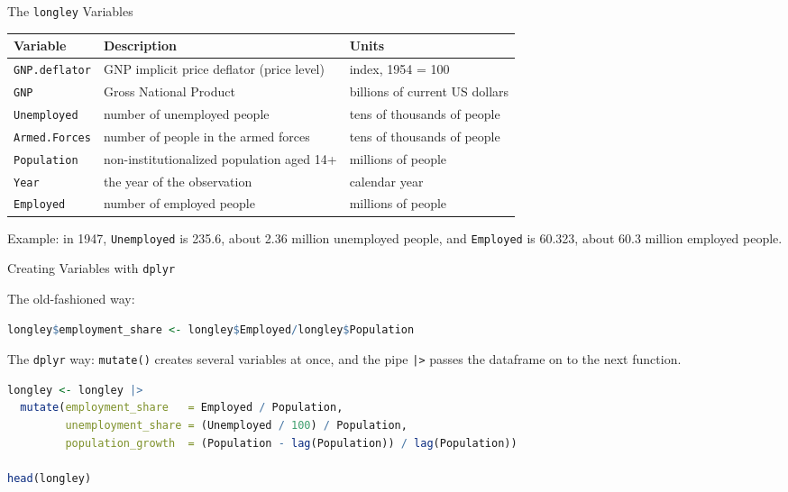 \documentclass[9pt,aspectratio=169]{beamer}
\begin{document}
\begin{frame}{The \texttt{longley} Variables}

\begin{center}
\small
\begin{tabular}{lll}
\toprule
\textbf{Variable} & \textbf{Description} & \textbf{Units} \\
\midrule
\texttt{GNP.deflator} & GNP implicit price deflator (price level) & index, 1954 = 100 \\
\texttt{GNP} & Gross National Product & billions of current US dollars \\
\texttt{Unemployed} & number of unemployed people & tens of thousands of people \\
\texttt{Armed.Forces} & number of people in the armed forces & tens of thousands of people \\
\texttt{Population} & non-institutionalized population aged 14+ & millions of people \\
\texttt{Year} & the year of the observation & calendar year \\
\texttt{Employed} & number of employed people & millions of people \\
\bottomrule
\end{tabular}
\end{center}

\pause
Example: in 1947, \texttt{Unemployed} is 235.6, about 2.36 million unemployed people, and \texttt{Employed} is 60.323, about 60.3 million employed people.
\end{frame}

\begin{frame}[fragile]{Creating Variables with \texttt{dplyr}}

The old-fashioned way:
\begin{lstlisting}[language=R, basicstyle=\ttfamily\small]
longley$employment_share <- longley$Employed/longley$Population
\end{lstlisting}
\pause
The \texttt{dplyr} way: \texttt{mutate()} creates several variables at once, and the pipe \texttt{|>} passes the dataframe on to the next function.
\begin{lstlisting}[language=R, basicstyle=\ttfamily\footnotesize]
longley <- longley |>
  mutate(employment_share   = Employed / Population,
         unemployment_share = (Unemployed / 100) / Population,
         population_growth  = (Population - lag(Population)) / lag(Population))

head(longley)
\end{lstlisting}
\end{frame}
\end{document}
